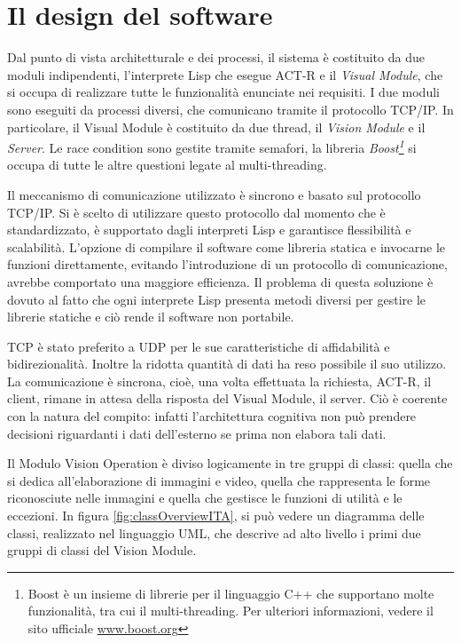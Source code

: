 			

	\section*{Il design del software}

		Dal punto di vista architetturale e dei processi, il sistema è costituito da due moduli indipendenti, l'interprete Lisp che esegue \mbox{ACT-R} e il \emph{Visual Module}, che si occupa di realizzare tutte le funzionalità enunciate nei requisiti.
		I due moduli sono eseguiti da processi diversi, che comunicano tramite il protocollo \mbox{TCP/IP}.
		In particolare, il Visual Module è costituito da due thread, il \emph{Vision Module} e il \emph{Server}.
		Le race condition sono gestite tramite semafori, la libreria \emph{Boost\footnote{Boost è un insieme di librerie per il linguaggio C++ che supportano molte funzionalità, tra cui il multi-threading. Per ulteriori informazioni, vedere il sito ufficiale \url{www.boost.org}}} si occupa di tutte le altre questioni legate al multi-threading.
		
		Il meccanismo di comunicazione utilizzato è sincrono e basato sul protocollo \mbox{TCP/IP}.
		Si è scelto di utilizzare questo protocollo dal momento che è standardizzato, è supportato dagli interpreti Lisp e garantisce flessibilità e scalabilità.
		L'opzione di compilare il software come libreria statica e invocarne le funzioni direttamente, evitando l'introduzione di un protocollo di comunicazione, avrebbe comportato una maggiore efficienza.
		Il problema di questa soluzione è dovuto al fatto che ogni interprete Lisp presenta metodi diversi per gestire le librerie statiche e ciò rende il software non portabile.

		TCP è stato preferito a UDP per le sue caratteristiche di affidabilità e bidirezionalità.
		Inoltre la ridotta quantità di dati ha reso possibile il suo utilizzo.
		La comunicazione è sincrona, cioè, una volta effettuata la richiesta, \mbox{ACT-R}, il client, rimane in attesa della risposta del Visual Module, il server. 
		Ciò è coerente con la natura del compito: infatti l'architettura cognitiva non può prendere decisioni riguardanti i dati dell'esterno se prima non elabora tali dati.

		Il Modulo Vision Operation è diviso logicamente in tre gruppi di classi: quella che si dedica all'elaborazione di immagini e video, quella che rappresenta le forme riconosciute nelle immagini e quella che gestisce le funzioni di utilità e le eccezioni.
		In figura \ref{fig:classOverviewITA}, si può vedere un diagramma delle classi, realizzato nel linguaggio UML, che descrive ad alto livello i primi due gruppi di classi del Vision Module.
	
